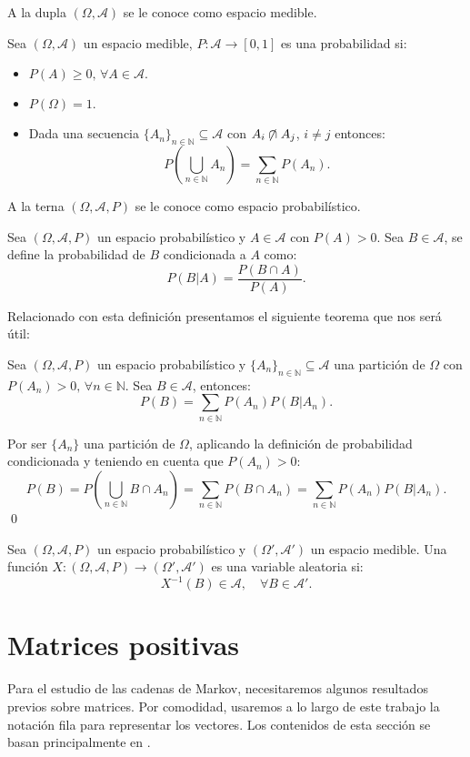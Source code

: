 A la dupla $(\Omega,\mathcal{A})$ se le conoce como espacio medible.
\begin{definition}
    Sea $(\Omega,\mathcal{A})$ un espacio medible, $P:\mathcal{A}\longrightarrow [0,1]$ es una probabilidad si:
    \begin{itemize}
        \item $P(A)\geq 0, \, \forall A\in\mathcal{A}.$
        \item $P(\Omega)=1.$
        \item Dada una secuencia $\{A_{n}\}_{n\in\mathbb{N}}\subseteq\mathcal{A}$ con $A_i\centernot\cap A_j$, $i\neq j$ entonces:
        \[P\left(\bigcup_{n\in\mathbb{N}}A_n\right)=\sum_{n\in\mathbb{N}}P(A_n).\]
    \end{itemize}
\end{definition}
A la terna $(\Omega,\mathcal{A},P)$ se le conoce como espacio probabilístico.
\begin{definition}
    Sea $(\Omega,\mathcal{A},P)$ un espacio probabilístico y $A\in\mathcal{A}$ con $P(A)>0$. Sea $B\in\mathcal{A}$, se define la probabilidad de $B$ condicionada a $A$ como:
    \[P(B|A)=\dfrac{P(B\cap A)}{P(A)}.\]
\end{definition}
Relacionado con esta definición presentamos el siguiente teorema que nos será útil:
\begin{theorem}
    Sea $(\Omega,\mathcal{A},P)$ un espacio probabilístico y $\{A_{n}\}_{n\in\mathbb{N}}\subseteq\mathcal{A}$ una partición de $\Omega$ con $P(A_n)>0, \,\forall n \in \mathbb{N}$. Sea $B\in\mathcal{A}$, entonces:
    \[P(B)=\sum_{n\in\mathbb{N}}P(A_n)P(B|A_n).\]
\end{theorem}
\begin{proofs*}
    Por ser $\{A_n\}$ una partición de $\Omega$, aplicando la definición de probabilidad condicionada y teniendo en cuenta que $P(A_n)>0$:
    \[P(B)=P\left(\bigcup_{n\in\mathbb{N}}B\cap A_n\right)=\sum_{n\in\mathbb{N}}P(B\cap A_n)
        =\sum_{n\in\mathbb{N}}P(A_n)P(B|A_n).\]\qed
\end{proofs*}

\begin{definition}
 Sea $(\Omega,\mathcal{A},P)$ un espacio probabilístico y $(\Omega',\mathcal{A}')$ un espacio medible. Una función $X:(\Omega,\mathcal{A},P)\longrightarrow(\Omega',\mathcal{A}')$ es una variable aleatoria si:
 \[X^{-1}(B)\in\mathcal{A}, \quad \forall B\in\mathcal{A}'.\]
\end{definition}

\section{Matrices positivas}
Para el estudio de las cadenas de Markov, necesitaremos algunos resultados previos sobre matrices. Por comodidad, usaremos a lo largo de este trabajo la notación fila para representar los vectores. Los contenidos de esta sección se basan principalmente en \cite{Salinelli}.


